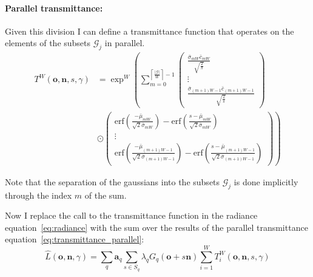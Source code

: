 \documentclass[a4paper, 11pt]{memoir}
\newcommand*{\erf}{\text{erf}}
\begin{document}
    \paragraph{Parallel \gls{transmittance}:}
    \label{par:parallel_transmittance}
    Given this division I can define a \gls{transmittance} function that operates on the elements of the subsets $\mathcal{G}_j$ in parallel.
    \begin{equation}
        \begin{aligned}
            T^W(\mathbf{o}, \mathbf{n}, s, \gamma) &= \exp^W\left( \sum_{m = 0}^{\left\lceil \frac{|\mathcal{G}|}{W} \right\rceil - 1}
            \begin{pmatrix}
                \frac{\bar{\sigma}_{mW}\bar{c}_{mW}}{\sqrt{\frac{2}{\pi}}} \\ \vdots \\\frac{\bar{\sigma}_{(m+1)W-1}\bar{c}_{(m+1)W-1}}{\sqrt{\frac{2}{\pi}}} 
            \end{pmatrix} \right.\\&\left.\odot \begin{pmatrix}
                \erf{\left( \frac{- \bar{\mu}_{mW}}{\sqrt{2}\bar{\sigma}_{mW}} \right) - \erf{\left( \frac{s - \bar{\mu}_{mW}}{\sqrt{2}\bar{\sigma}_{mW}} \right)}} \\
                \vdots \\
               \erf{\left( \frac{- \bar{\mu}_{(m+1)W - 1}}{\sqrt{2}\bar{\sigma}_{(m+1)W - 1}} \right) - \erf{\left( \frac{s - \bar{\mu}_{(m+1)W - 1}}{\sqrt{2}\bar{\sigma}_{(m+1)W - 1}} \right)}} 
            \end{pmatrix}\right)
        \end{aligned}
        \label{eq:transmittance_parallel}
    \end{equation}

    Note that the separation of the gaussians into the subsets $\mathcal{G}_j$ is done implicitly through the index $m$ of the sum.

    Now I replace the call to the \gls{transmittance} function in the \gls{radiance} equation~\eqref{eq:radiance} with the sum
    over the results of the parallel \gls{transmittance} equation~\eqref{eq:transmittance_parallel}:
    \begin{equation}
        \hat{L}(\mathbf{o}, \mathbf{n}, \gamma) = \sum_{q} \mathbf{a}_q \sum_{s \in S_q} \lambda_qG_q(\mathbf{o} + s\mathbf{n})\sum_{i = 1}^W T^W_i(\mathbf{o}, \mathbf{n}, s, \gamma)
    \end{equation}
\end{document}
